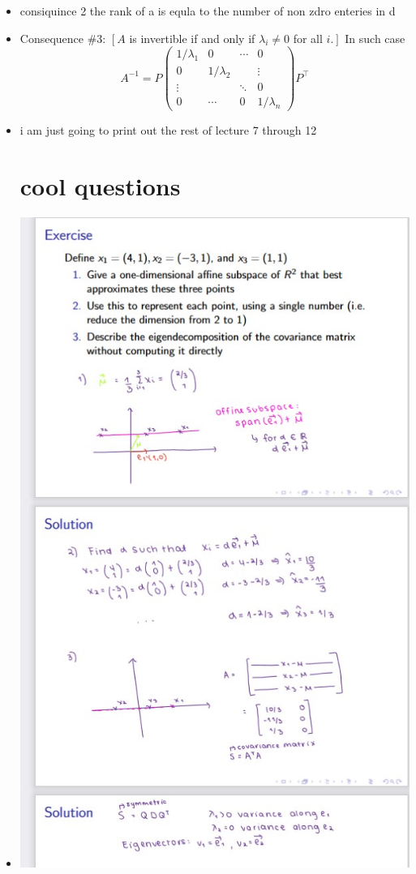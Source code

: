 \documentclass[12pt,twoside]{article}
\begin{document}
\begin{itemize}
\item consiquince 2 the rank of a is equla to the number of non zdro enteries in d 
\item Consequence \#3: $\left[A\right.$ is invertible if and only if $\lambda_i \neq 0$ for all $\left.i.\right]$ In such case
$$
A^{-1}=P\left(\begin{array}{cccc}
1 / \lambda_1 & 0 & \cdots & 0 \\
0 & 1 / \lambda_2 & & \vdots \\
\vdots & & \ddots & 0 \\
0 & \cdots & 0 & 1 / \lambda_n
\end{array}\right) P^{\top}
$$
\item i am just going to print out the rest of lecture 7 through 12 

\section{cool questions }
\item \includegraphics[width=15cm]{final Review/lab 7 excercise 3 .jpg}

\end{itemize}
\end{document}
